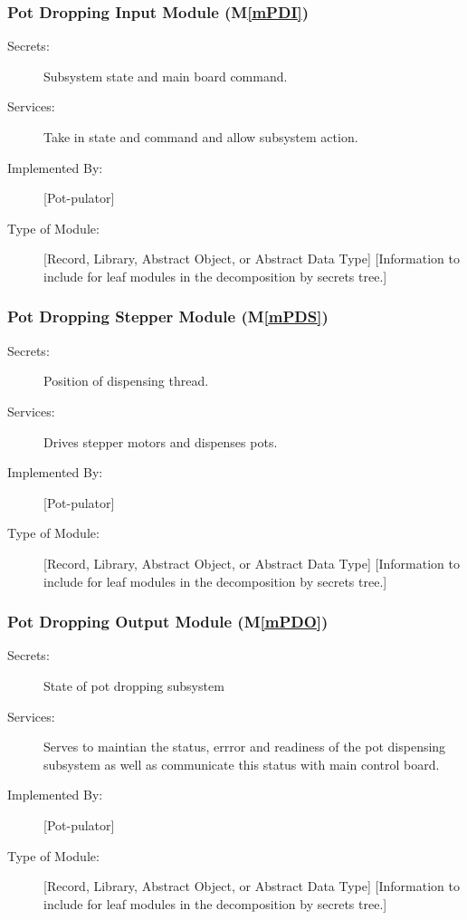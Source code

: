\documentclass[12pt, titlepage]{article}
\newcommand{\mref}[1]{M\ref{#1}}
\begin{document}
\subsubsection{Pot Dropping Input Module (\mref{mPDI})}
\begin{description}
\item[Secrets:] Subsystem state and main board command.
\item[Services:] Take in state and command and allow subsystem action.
\item[Implemented By:] [Pot-pulator]
\item[Type of Module:] [Record, Library, Abstract Object, or Abstract Data Type]
  [Information to include for leaf modules in the decomposition by secrets tree.]
\end{description}



\subsubsection{Pot Dropping Stepper Module (\mref{mPDS})}
\begin{description}
\item[Secrets:] Position of dispensing thread.
\item[Services:] Drives stepper motors and dispenses pots.
\item[Implemented By:] [Pot-pulator]
\item[Type of Module:] [Record, Library, Abstract Object, or Abstract Data Type]
  [Information to include for leaf modules in the decomposition by secrets tree.]
\end{description}

\subsubsection{Pot Dropping Output Module (\mref{mPDO})}
\begin{description}
\item[Secrets:] State of pot dropping subsystem
\item[Services:] Serves to maintian the status, errror and readiness of the pot dispensing subsystem as well as
communicate this status with main control board.
\item[Implemented By:] [Pot-pulator]
\item[Type of Module:] [Record, Library, Abstract Object, or Abstract Data Type]
  [Information to include for leaf modules in the decomposition by secrets tree.]
\end{description}
\end{document}
